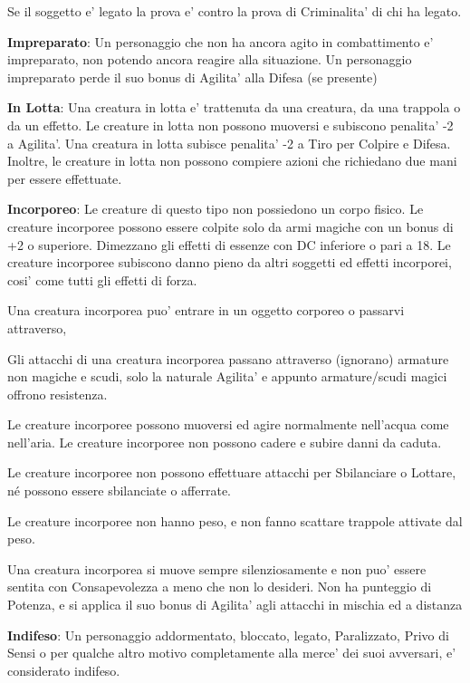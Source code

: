 \documentclass[a4paper,11pt,twoside,openany]{book}
\begin{document}
{Se il soggetto e' legato la prova e' contro la prova di Criminalita' di chi ha legato.

\textbf{Impreparato}: Un personaggio che non ha ancora agito in combattimento e' impreparato, non potendo ancora reagire alla situazione. Un personaggio impreparato perde il suo bonus di Agilita' alla Difesa (se presente)

\textbf{In Lotta}: Una creatura in lotta e' trattenuta da una creatura,
da una trappola o da un effetto. Le creature in lotta non possono
muoversi e subiscono penalita' -2 a Agilita'. Una creatura in lotta
subisce penalita' -2 a Tiro per Colpire e Difesa. Inoltre, le creature
in lotta non possono compiere azioni che richiedano due mani per essere
effettuate.

\textbf{Incorporeo}: Le creature di questo tipo non possiedono un corpo fisico. Le creature incorporee possono essere colpite solo da armi magiche con un bonus di +2 o superiore. Dimezzano gli effetti di essenze con DC inferiore o pari a 18. Le creature incorporee subiscono danno pieno da altri soggetti ed effetti incorporei, cosi' come tutti gli effetti di forza.

Una creatura incorporea puo' entrare in un oggetto corporeo o passarvi attraverso,

Gli attacchi di una creatura incorporea passano attraverso (ignorano) armature non magiche e scudi, solo la naturale Agilita' e appunto armature/scudi magici offrono resistenza.

Le creature incorporee possono muoversi ed agire normalmente nell'acqua come nell'aria. Le creature incorporee non possono cadere e subire danni da caduta.

Le creature incorporee non possono effettuare attacchi per Sbilanciare o Lottare, né possono essere sbilanciate o afferrate.

Le creature incorporee non hanno peso, e non fanno scattare trappole attivate dal peso.

Una creatura incorporea si muove sempre silenziosamente e non puo' essere sentita con Consapevolezza a meno che non lo desideri. Non ha punteggio di Potenza, e si applica il suo bonus di Agilita' agli attacchi in mischia ed a distanza

\textbf{Indifeso}: Un personaggio addormentato, bloccato, legato, Paralizzato, Privo di Sensi o per qualche altro motivo completamente alla merce' dei suoi avversari, e' considerato indifeso.

}
\end{document}
